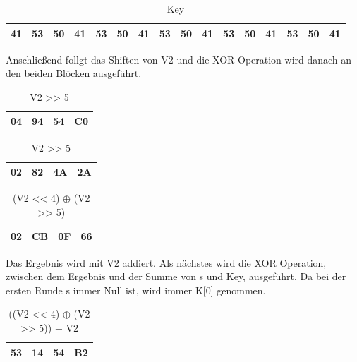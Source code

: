 \documentclass[course=asp]{aspdoc}
\begin{document}
\begin{table}[H]
\centering
    \begin{tabular}{|l|l|l|l||l|l|l|l||l|l|l|l||l|l|l|l|}
        \hline
        41 & 53 & 50 & 41 & 53 & 50 & 41 & 53  & 50 & 41 & 53 & 50 & 41 & 53 & 50 & 41 \\
        \hline
    \end{tabular}
    \caption{Key}
\end{table}


Anschließend follgt das Shiften von V2 und die XOR Operation wird danach an den beiden Blöcken ausgeführt.
\begin{table}[H]

    \begin{minipage}{.5\linewidth}

      \centering
        \begin{tabular}{|l|l|l|l|}
		\hline
            04 & 94 & 54 & C0   \\
		\hline
        \end{tabular}

	\caption{V2 << 4}
    \end{minipage}%
    \begin{minipage}{.5\linewidth}

 \centering

        \begin{tabular}{|l|l|l|l|}
           \hline
		 02 & 82 & 4A & 2A   \\
		\hline
        \end{tabular}
\caption{V2 >> 5}
    \end{minipage}
\end{table}

\begin{table}[H]
\centering
    \begin{tabular}{|l|l|l|l|}
        \hline
        02 & CB & 0F & 66    \\
        \hline
    \end{tabular}
    \caption{(V2 << 4) $\oplus$ (V2 >> 5)}
\end{table}
Das Ergebnis wird mit V2 addiert. Als nächstes wird die XOR Operation, zwischen dem Ergebnis und der Summe von s und Key, ausgeführt. Da bei der ersten Runde s immer Null ist, wird immer K[0] genommen.
\begin{table}[H]
\centering
    \begin{tabular}{|l|l|l|l|}
        \hline
        53 & 14 & 54 & B2    \\
        \hline
    \end{tabular}
    \caption{((V2 << 4) $\oplus$ (V2 >> 5)) + V2}
\end{table}
\end{document}
